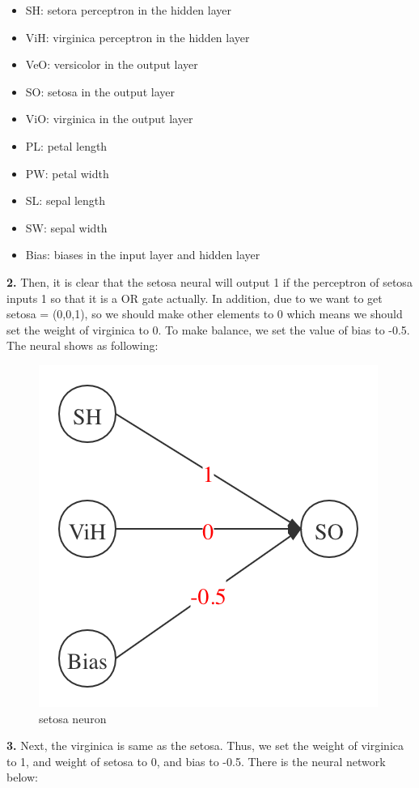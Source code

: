 \documentclass{article}
\begin{document}
\noindent
\begin{itemize}
	\item SH: setora perceptron in the hidden layer
	\item ViH: virginica perceptron in the hidden layer
	\item VeO: versicolor in the output layer
	\item SO: setosa in the output layer
	\item ViO: virginica in the output layer
	\item PL: petal length
	\item PW: petal width
	\item SL: sepal length
	\item SW: sepal width
	\item Bias: biases in the input layer and hidden layer
\end{itemize}
\textbf{2.} Then, it is clear that the setosa neural will output 1 if the perceptron of setosa inputs 1 so that it is a OR gate actually. In addition, due to we want to get setosa = (0,0,1), so we should make other elements to 0 which means we should set the weight of virginica to 0. To make balance, we set the value of bias to -0.5. The neural shows as following:
\begin{figure}[H]
\centering
\includegraphics[scale=0.3]{./img/SO.png}
\caption{setosa neuron}
\end{figure}
\noindent
\textbf{3.} Next, the virginica is same as the setosa. Thus, we set the weight of virginica to 1, and weight of setosa to 0, and bias to -0.5. There is the neural network below:
\end{document}
